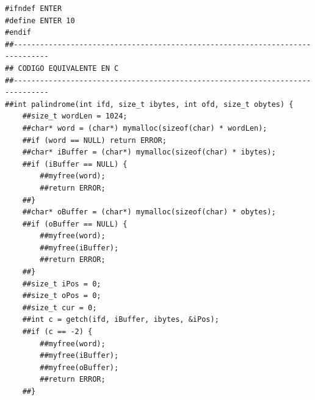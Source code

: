 \documentclass[a4paper,10pt]{article}
\begin{document}
\begin{lstlisting}
#ifndef ENTER
#define ENTER 10
#endif
##------------------------------------------------------------------------------
## CODIGO EQUIVALENTE EN C
##------------------------------------------------------------------------------
##int palindrome(int ifd, size_t ibytes, int ofd, size_t obytes) {
    ##size_t wordLen = 1024;
    ##char* word = (char*) mymalloc(sizeof(char) * wordLen);
    ##if (word == NULL) return ERROR;
    ##char* iBuffer = (char*) mymalloc(sizeof(char) * ibytes);
    ##if (iBuffer == NULL) {
        ##myfree(word);
        ##return ERROR;
    ##}
    ##char* oBuffer = (char*) mymalloc(sizeof(char) * obytes);
    ##if (oBuffer == NULL) {
        ##myfree(word);
        ##myfree(iBuffer);
        ##return ERROR;
    ##}
    ##size_t iPos = 0;
    ##size_t oPos = 0;
    ##size_t cur = 0;
    ##int c = getch(ifd, iBuffer, ibytes, &iPos);
    ##if (c == -2) {
        ##myfree(word);
        ##myfree(iBuffer);
        ##myfree(oBuffer);
        ##return ERROR;
    ##}


\end{lstlisting}
\end{document}
